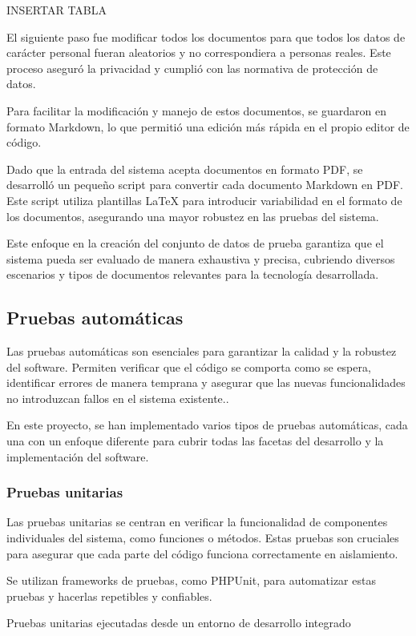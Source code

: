 INSERTAR TABLA

El siguiente paso fue modificar todos los documentos para que todos los datos de carácter personal fueran aleatorios y
no correspondiera a personas reales. Este proceso aseguró la privacidad y cumplió con las normativa de protección de
datos.

Para facilitar la modificación y manejo de estos documentos, se guardaron en formato Markdown, lo que permitió una
edición más rápida en el propio editor de código.

Dado que la entrada del sistema acepta documentos en formato PDF, se desarrolló un pequeño script para convertir cada
documento Markdown en PDF. Este script utiliza plantillas LaTeX para introducir variabilidad en el formato de los
documentos, asegurando una mayor robustez en las pruebas del sistema.


Este enfoque en la creación del conjunto de datos de prueba garantiza que el sistema pueda ser evaluado de manera
exhaustiva y precisa, cubriendo diversos escenarios y tipos de documentos relevantes para la tecnología desarrollada.

\subsection*{Pruebas automáticas}
Las pruebas automáticas son esenciales para garantizar la calidad y la robustez del software. Permiten verificar que el
código se comporta como se espera, identificar errores de manera temprana y asegurar que las nuevas funcionalidades no
introduzcan fallos en el sistema existente..

En este proyecto, se han implementado varios tipos de pruebas automáticas, cada una con un enfoque diferente para cubrir
todas las facetas del desarrollo y la implementación del software.

\subsubsection*{Pruebas unitarias}
Las pruebas unitarias se centran en verificar la funcionalidad de componentes individuales del sistema, como funciones o
métodos. Estas pruebas son cruciales para asegurar que cada parte del código funciona correctamente en aislamiento.

Se utilizan frameworks de pruebas, como PHPUnit, para automatizar estas pruebas y hacerlas repetibles y confiables.


Pruebas unitarias ejecutadas desde un entorno de desarrollo integrado

